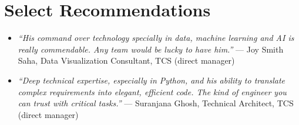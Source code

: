 \documentclass[letterpaper,11pt]{article}
\begin{document}
\section{Select Recommendations}
\begin{itemize}[leftmargin=0.15in]
  \item \small \textit{``His command over technology specially in data, machine learning and AI is really commendable. Any team would be lucky to have him.''} --- Joy Smith Saha, Data Visualization Consultant, TCS (direct manager)
  \item \small \textit{``Deep technical expertise, especially in Python, and his ability to translate complex requirements into elegant, efficient code. The kind of engineer you can trust with critical tasks.''} --- Suranjana Ghosh, Technical Architect, TCS (direct manager)
\end{itemize}
\end{document}
